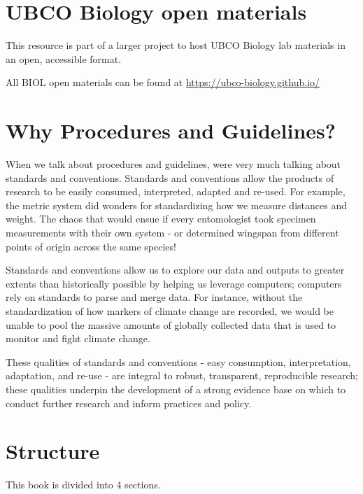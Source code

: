 \documentclass[
]{book}
\begin{document}
\section*{UBCO Biology open materials}\label{ubco-biology-open-materials}

This resource is part of a larger project to host UBCO Biology lab materials in an open, accessible format.

All BIOL open materials can be found at \url{https://ubco-biology.github.io/}

\section*{Why Procedures and Guidelines?}\label{why-procedures-and-guidelines}

When we talk about procedures and guidelines, we\textquotesingle re very much talking about standards and conventions. Standards and conventions allow the products of research to be easily consumed, interpreted, adapted and re-used. For example, the metric system did wonders for standardizing how we measure distances and weight. The chaos that would ensue if every entomologist took specimen measurements with their own system - or determined wingspan from different points of origin across the same species!

Standards and conventions allow us to explore our data and outputs to greater extents than historically possible by helping us leverage computers; computers rely on standards to parse and merge data. For instance, without the standardization of how markers of climate change are recorded, we would be unable to pool the massive amounts of globally collected data that is used to monitor and fight climate change.

These qualities of standards and conventions - easy consumption, interpretation, adaptation, and re-use - are integral to robust, transparent, reproducible research; these qualities underpin the development of a strong evidence base on which to conduct further research and inform practices and policy.

\section*{Structure}\label{structure}

This book is divided into 4 sections.
\end{document}
